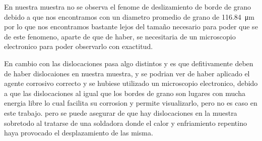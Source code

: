 \documentclass[12pt,a4paper]{article}
\begin{document}
En nuestra muestra no se observa el fenome de deslizamiento de borde de grano debido a que nos encontramos con un diametro promedio de grano de \SI{116,84}{\micro\metre} por lo que nos encontramos bastante lejos del tamaño necesario para poder que se de este fenomeno, aparte de que de haber, se necesitaria de un microscopio electronico para poder observarlo con exactitud.

En cambio con las dislocaciones pasa algo distintos y es que defitivamente deben de haber dislocaiones en nuestra muestra, y se podrian ver de haber aplicado el agente corrosivo correcto y se hubiese utilizado un microscopio electronico, debido a que las dislocaciones al igual que los bordes de grano son lugares con mucha energia libre lo cual facilita su corrosion y permite visualizarlo, pero no es caso en este trabajo.
pero se puede asegurar de que hay dislocaciones en la muestra sobretodo al tratarse de una soldadora donde el calor y enfriamiento repentino haya provocado el desplazamiento de las misma.
\end{document}
